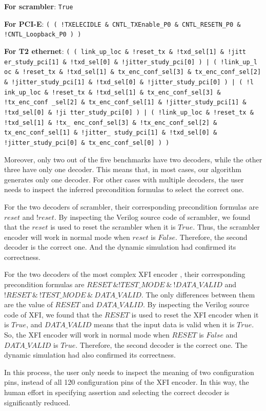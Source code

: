 \documentclass[runningheads,a4paper,orivec]{llncs}
\begin{document}
\textbf{For scrambler}:
\texttt{True}

\textbf{For PCI-E}:
\texttt{( ( !TXELECIDLE \& CNTL\_TXEnable\_P0 \& CNTL\_RESETN\_P0 \& !CNTL\_Loopback\_P0 ) )}

\textbf{For T2 ethernet}:
\texttt{( ( link\_up\_loc \& !reset\_tx \& !txd\_sel[1] \& !jitt er\_study\_pci[1] \& !txd\_sel[0] \& !jitter\_study\_pci[0] ) | ( !link\_up\_l oc \& !reset\_tx \& !txd\_sel[1] \& tx\_enc\_conf\_sel[3] \& tx\_enc\_conf\_sel[2] \& !jitter\_study\_pci[1] \& !txd\_sel[0] \& !jitter\_study\_pci[0] ) | ( !l ink\_up\_loc \& !reset\_tx \& !txd\_sel[1] \& tx\_enc\_conf\_sel[3] \& !tx\_enc\_conf \_sel[2] \& tx\_enc\_conf\_sel[1] \& !jitter\_study\_pci[1] \& !txd\_sel[0] \& !ji tter\_study\_pci[0] ) | ( !link\_up\_loc \& !reset\_tx \& !txd\_sel[1] \& !tx\_ enc\_conf\_sel[3] \& !tx\_enc\_conf\_sel[2] \& tx\_enc\_conf\_sel[1] \& !jitter\_ study\_pci[1] \& !txd\_sel[0] \& !jitter\_study\_pci[0] \& tx\_enc\_conf\_sel[0] ) )}

Moreover,
only two out of the five benchmarks have two decoders,
while the other three have only one decoder.
This means that,
in most cases,
our algorithm generates only one decoder.
For other cases with multiple decoders,
the user needs to inspect the inferred precondition formulas to select the correct one.

For the two decoders of scrambler,
their corresponding precondition formulas are $reset$ and $!reset$.
By inspecting the Verilog source code of scrambler,
we found that the $reset$ is used to reset the scrambler when it is $True$.
Thus,
the scrambler encoder will work in normal mode when $reset$ is $False$.
Therefore,
the second decoder is the correct one.
And the dynamic simulation had confirmed its correctness.


For the two decoders of the most complex XFI encoder ,
their corresponding precondition formulas are $RESET~\& !TEST\_MODE~\&~!DATA\_VALID$ and $!RESET~\&~!TEST\_MODE~\&~DATA\_VALID$.
The only differences between them are the value of $RESET$ and $DATA\_VALID$.
By inspecting the Verilog source code of XFI,
we found that the $RESET$ is used to reset the XFI encoder when it is $True$,
and $DATA\_VALID$ means that the input data is valid when it is $True$.
So,
the XFI encoder will work in normal mode when $RESET$ is $False$ and $DATA\_VALID$ is $True$.
Therefore,
the second decoder is the correct one.
The dynamic simulation had also confirmed its correctness.

In this process,
the user only needs to inspect the meaning of two configuration pins,
instead of all 120 configuration pins of the XFI encoder.
In this way,
the human effort in specifying assertion and selecting the correct decoder is significantly reduced.
\end{document}
